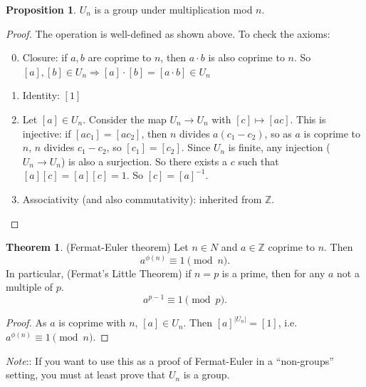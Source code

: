 \documentclass[a4paper]{article}
\theoremstyle{definition}
\newtheorem*{prop}{Proposition}
\newtheorem*{thm}{Theorem}
\newcommand{\note}{\noindent \emph{Note}:\;}
\newcommand{\Z}{\mathbb{Z}}
\begin{document}
\begin{prop}
  $U_n$ is a group under multiplication mod $n$.
\end{prop}

\begin{proof}
  The operation is well-defined as shown above. To check the axioms:
  \begin{enumerate}[label=\arabic{*}.]
  \setcounter{enumi}{-1}
  \item Closure: if $a, b$ are coprime to $n$, then $a\cdot b$ is also coprime to $n$. So $[a], [b]\in U_n \Rightarrow [a]\cdot [b] = [a\cdot b]\in U_n$
  \item Identity: $[1]$
  \item Let $[a]\in U_n$. Consider the map $U_n \to U_n$ with $[c]\mapsto [ac]$. This is injective: if $[ac_1] = [ac_2]$, then $n $ divides $a(c_1 - c_2)$, so as $a$ is coprime to $n$, $n$ divides $c_1 - c_2$, so $[c_1] = [c_2]$. Since $U_n$ is finite, any injection ($U_n \to U_n$) is also a surjection. So there exists a $c$ such that $[a][c] = [a][c] = 1$. So $[c] = [a]^{-1}$.
  \item Associativity (and also commutativity): inherited from $\Z$.
  \end{enumerate}
\end{proof}
\begin{thm}
  (Fermat-Euler theorem) Let $n\in N$ and $a\in \Z$ coprime to $n$. Then
  \[
  a^{\phi(n)} \equiv 1\pmod n.
  \]
  In particular, (Fermat's Little Theorem) if $n = p$ is a prime, then for any $a$ not a multiple of $p$.
  \[
  a^{p - 1}\equiv 1\pmod p.
  \]
\end{thm}

\begin{proof}
  As $a$ is coprime with $n$, $[a]\in U_n$. Then $[a]^{|U_n|} = [1]$, i.e. $a^{\phi(n)} \equiv 1\pmod n$.
\end{proof}
\note: If you want to use this as a proof of Fermat-Euler in a ``non-groups'' setting, you must at least prove that $U_n$ is a group.
\end{document}
